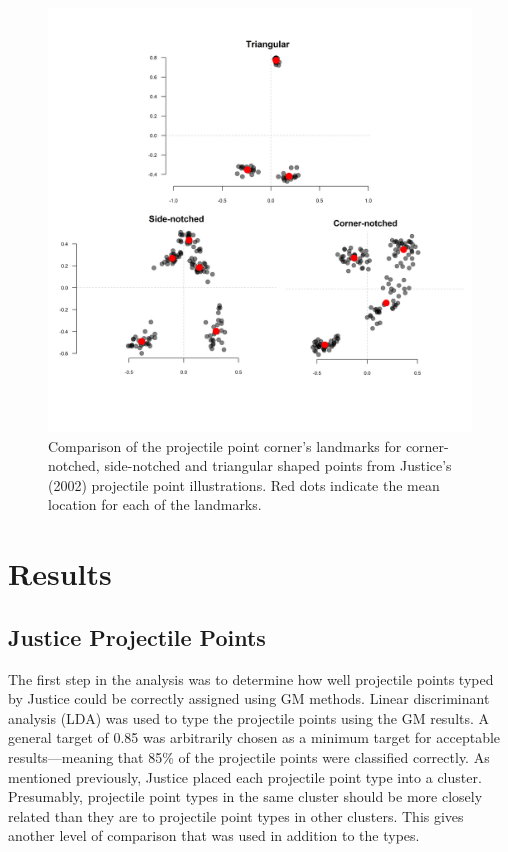 \documentclass[letterpaper]{article}
\begin{document}
\begin{figure}
\includegraphics[width=1\linewidth]{figures/cornerComparison} \caption{Comparison of the projectile point corner's landmarks for corner-notched, side-notched and triangular shaped points from Justice's (2002) projectile point illustrations. Red dots indicate the mean location for each of the landmarks.}\label{fig:cornerComparison}
\end{figure}

\hypertarget{results}{%
\section*{Results}\label{results}}

\hypertarget{justice-projectile-points}{%
\subsection*{Justice Projectile Points}\label{justice-projectile-points}}

The first step in the analysis was to determine how well projectile points typed by Justice could be correctly assigned using GM methods. Linear discriminant analysis (LDA) was used to type the projectile points using the GM results. A general target of 0.85 was arbitrarily chosen as a minimum target for acceptable results---meaning that 85\% of the projectile points were classified correctly. As mentioned previously, Justice placed each projectile point type into a cluster. Presumably, projectile point types in the same cluster should be more closely related than they are to projectile point types in other clusters. This gives another level of comparison that was used in addition to the types.
\end{document}
